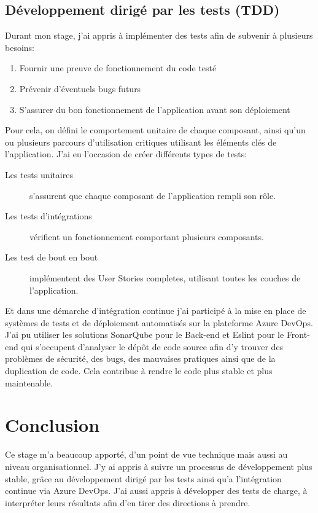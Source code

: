 \documentclass[12pt, a4paper]{report}
\begin{document}
        \section{Développement dirigé par les tests (TDD)}
            Durant mon stage, j'ai appris à implémenter des tests afin de subvenir à plusieurs besoins\@:
            \begin{enumerate}
                \item Fournir une preuve de fonctionnement du code testé
                \item Prévenir d'éventuels bugs futurs
                \item S'assurer du bon fonctionnement de l'application avant son déploiement
            \end{enumerate}
            Pour cela, on défini le comportement unitaire de chaque composant, ainsi qu'un ou plusieurs parcours d'utilisation critiques utilisant les éléments clés de l'application.\newline
            J'ai eu l'occasion de créer différents types de tests\@:
            \begin{description}
                \item [Les tests unitaires] s'assurent que chaque composant de l'application rempli son rôle.
                \item [Les tests d'intégrations] vérifient un fonctionnement comportant plusieurs composants.
                \item [Les test de bout en bout] implémentent des User Stories completes, utilisant toutes les couches de l'application.
            \end{description}
            Et dans une démarche d'intégration continue j'ai participé à la mise en place de systèmes de tests et de déploiement automatisés sur la plateforme Azure DevOps.\newline
            J'ai pu utiliser les solutions SonarQube pour le Back-end et Eslint pour le Front-end qui s'occupent d'analyser le dépôt de code source afin d'y trouver des problèmes de sécurité, des bugs, des mauvaises pratiques ainsi que de la duplication de code.\newline
            Cela contribue à rendre le code plus stable et plus maintenable.\newline
    \chapter{Conclusion}
        Ce stage m'a beaucoup apporté, d'un point de vue technique mais aussi au niveau organisationnel.\newline
        J'y ai appris à suivre un processus de développement plus stable, grâce au développement dirigé par les tests ainsi qu'a l'intégration continue via Azure DevOps.\newline
        J'ai aussi appris à développer des tests de charge, à interpréter leurs résultats afin d'en tirer des directions à prendre.\newline
    \appendix
\end{document}
